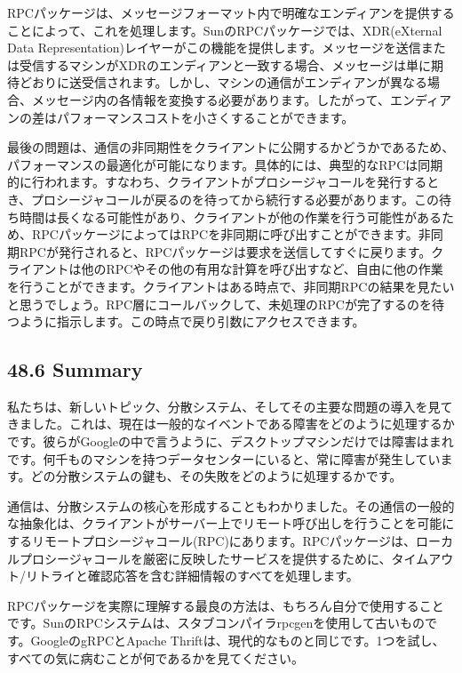 RPCパッケージは、メッセージフォーマット内で明確なエンディアンを提供することによって、これを処理します。SunのRPCパッケージでは、XDR(eXternal
Data
Representation)レイヤーがこの機能を提供します。メッセージを送信または受信するマシンがXDRのエンディアンと一致する場合、メッセージは単に期待どおりに送受信されます。しかし、マシンの通信がエンディアンが異なる場合、メッセージ内の各情報を変換する必要があります。したがって、エンディアンの差はパフォーマンスコストを小さくすることができます。

最後の問題は、通信の非同期性をクライアントに公開するかどうかであるため、パフォーマンスの最適化が可能になります。具体的には、典型的なRPCは同期的に行われます。すなわち、クライアントがプロシージャコールを発行するとき、プロシージャコールが戻るのを待ってから続行する必要があります。この待ち時間は長くなる可能性があり、クライアントが他の作業を行う可能性があるため、RPCパッケージによってはRPCを非同期に呼び出すことができます。非同期RPCが発行されると、RPCパッケージは要求を送信してすぐに戻ります。クライアントは他のRPCやその他の有用な計算を呼び出すなど、自由に他の作業を行うことができます。クライアントはある時点で、非同期RPCの結果を見たいと思うでしょう。RPC層にコールバックして、未処理のRPCが完了するのを待つように指示します。この時点で戻り引数にアクセスできます。

\hypertarget{summary-34}{%
\subsection*{48.6 Summary}\label{summary-34}}

私たちは、新しいトピック、分散システム、そしてその主要な問題の導入を見てきました。これは、現在は一般的なイベントである障害をどのように処理するかです。彼らがGoogleの中で言うように、デスクトップマシンだけでは障害はまれです。何千ものマシンを持つデータセンターにいると、常に障害が発生しています。どの分散システムの鍵も、その失敗をどのように処理するかです。

通信は、分散システムの核心を形成することもわかりました。その通信の一般的な抽象化は、クライアントがサーバー上でリモート呼び出しを行うことを可能にするリモートプロシージャコール(RPC)にあります。RPCパッケージは、ローカルプロシージャコールを厳密に反映したサービスを提供するために、タイムアウト/リトライと確認応答を含む詳細情報のすべてを処理します。

RPCパッケージを実際に理解する最良の方法は、もちろん自分で使用することです。SunのRPCシステムは、スタブコンパイラrpcgenを使用して古いものです。GoogleのgRPCとApache
Thriftは、現代的なものと同じです。1つを試し、すべての気に病むことが何であるかを見てください。

